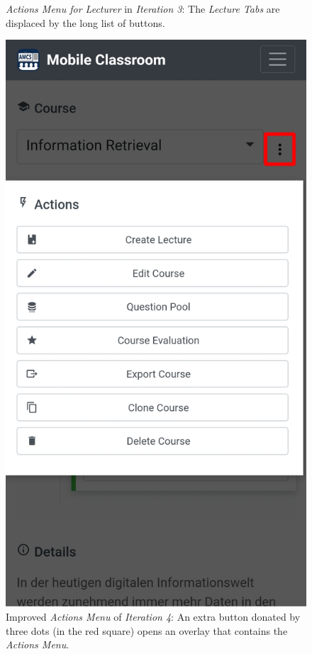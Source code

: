 \begin{figure}
\begin{minipage}[t]{.5\textwidth}
		\captionsetup{width=.8\linewidth}
		\caption{\emph{Actions Menu for Lecturer} in \emph{Iteration 3}: The \emph{Lecture Tabs} are displaced by the long list of buttons. }
		\label{fig:main_view_course_options_bad}
	\end{minipage}%
	\begin{minipage}[t]{.5\textwidth}
		\centering
		\includegraphics[width=0.95\linewidth]{screenshots/redesign/main_view_iteration_4_actions.jpg}
		\captionsetup{width=.8\linewidth}
		\caption{Improved \emph{Actions Menu} of \emph{Iteration 4}: An extra button donated by three dots (in the red square) opens an overlay that contains the \emph{Actions Menu}.}
		\label{fig:main_view_course_options_good}
	\end{minipage}
\end{figure}



